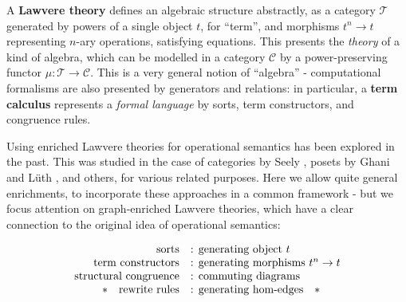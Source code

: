 \documentclass[a4paper,UKenglish]{article}
\theoremstyle{definition}
\newcommand{\C}{\mathscr{C}}
\newcommand{\T}{\mathscr{T}}
\begin{document}
A \textbf{Lawvere theory} \cite{lawvere} defines an algebraic structure abstractly, as a category $\T$ generated by powers of a single object $t$, for ``term'', and morphisms $t^n \to t$ representing $n$-ary operations, satisfying equations. This presents the \textit{theory} of a kind of algebra, which can be modelled in a category $\C$ by a power-preserving functor $\mu:\T \to \C$. This is a very general notion of ``algebra'' - computational formalisms are also presented by generators and relations: in particular, a \textbf{term calculus} represents a \textit{formal language} by sorts, term constructors, and congruence rules.

Using enriched Lawvere theories for operational semantics has been explored in the past. This was studied in the case of categories by Seely \cite{seely}, posets by Ghani and L\"uth \cite{ghani}, and others, for various related purposes. Here we allow quite general enrichments, to incorporate these approaches in a common framework - but we focus attention on graph-enriched Lawvere theories, which have a clear connection to the original idea of operational semantics:

\[\begin{array}{rl}
\text{sorts} & \text{: generating object } t\\
\text{term constructors} & \text{: generating morphisms } t^n \to t\\
\text{structural congruence} & \text{: commuting diagrams}\\
\text{\textasteriskcentered \quad rewrite rules} & \text{: generating hom-edges\quad\textasteriskcentered}\\
\end{array}\]
\end{document}
